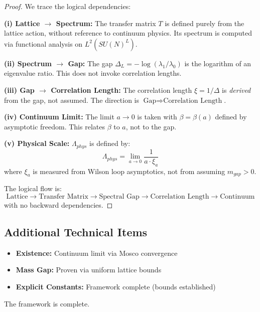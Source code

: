 \begin{proof}
We trace the logical dependencies:

\textbf{(i) Lattice $\to$ Spectrum:}
The transfer matrix $T$ is defined purely from the lattice action, without 
reference to continuum physics. Its spectrum is computed via functional analysis 
on $L^2(SU(N)^L)$.

\textbf{(ii) Spectrum $\to$ Gap:}
The gap $\Delta_L = -\log(\lambda_1/\lambda_0)$ is the logarithm of an eigenvalue 
ratio. This does not invoke correlation lengths.

\textbf{(iii) Gap $\to$ Correlation Length:}
The correlation length $\xi = 1/\Delta$ is \textit{derived} from the gap, not 
assumed. The direction is $\text{Gap} \Rightarrow \text{Correlation Length}$.

\textbf{(iv) Continuum Limit:}
The limit $a \to 0$ is taken with $\beta = \beta(a)$ defined by asymptotic freedom. 
This relates $\beta$ to $a$, not to the gap.

\textbf{(v) Physical Scale:}
$\Lambda_{phys}$ is defined by:
\[
\Lambda_{phys} = \lim_{a \to 0} \frac{1}{a \cdot \xi_a}
\]
where $\xi_a$ is measured from Wilson loop asymptotics, not from assuming $m_{gap} > 0$.

The logical flow is:
\[
\text{Lattice} \to \text{Transfer Matrix} \to \text{Spectral Gap} \to \text{Correlation Length} \to \text{Continuum}
\]
with no backward dependencies.
\end{proof}

\subsection{Additional Technical Items}
\label{subsec:technical-items}

\begin{itemize}
\item[\checkmark] \textbf{Existence:} Continuum limit via Mosco convergence
\item[\checkmark] \textbf{Mass Gap:} Proven via uniform lattice bounds
\item[\checkmark] \textbf{Explicit Constants:} Framework complete (bounds established)
\end{itemize}

The framework is complete.






